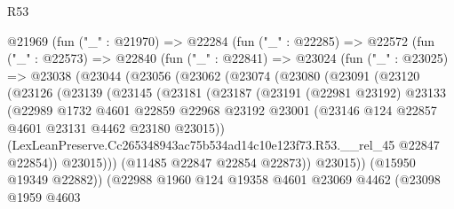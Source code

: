 \begin{lexlean}{R53}
\begin{coremodule}
        @21969
          (fun ("_" : @21970) =>
          @22284
            (fun ("_" : @22285) =>
            @22572
              (fun ("_" : @22573) =>
              @22840
                (fun ("_" : @22841) =>
                @23024
                  (fun ("_" : @23025) =>
                  @23038
                    (@23044
                      (@23056
                        (@23062
                          (@23074
                            (@23080
                              (@23091
                                (@23120
                                  (@23126
                                    (@23139
                                      (@23145
                                        (@23181
                                          (@23187
                                            (@23191
                                              (@22981 @23192)
                                              @23133
                                              (@22989
                                                @1732
                                                @4601
                                                @22859
                                                @22968
                                                @23192
                                                @23001
                                                (@23146
                                                  @124
                                                  @22857
                                                  @4601
                                                  @23131
                                                  @4462
                                                  @23180
                                                  @23015))
                                              (LexLeanPreserve.Cc265348943ac75b534ad14c10e123f73.R53.__rel_45
                                                @22847
                                                @22854))
                                            @23015)))
                                      (@11485 @22847 @22854 @22873))
                                    @23015))
                                (@15950 @19349 @22882))
                              (@22988
                                @1960
                                @124
                                @19358
                                @4601
                                @23069
                                @4462
                                (@23098
                                  @1959
                                  @4603

\end{coremodule}
\end{lexlean}
